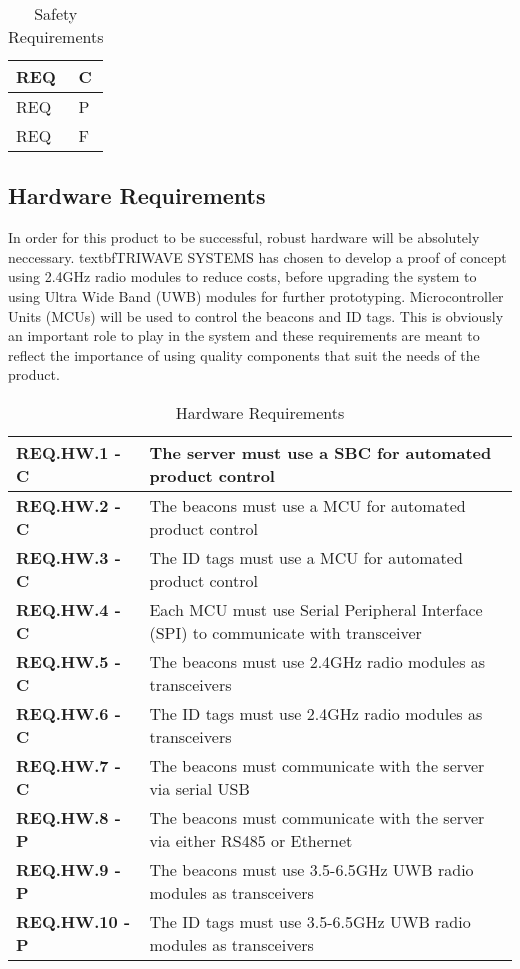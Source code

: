 \documentclass[11pt]{article}
\begin{document}
\bgroup
\def\arraystretch{1.5}
\begin{table}[H]
\centering
\begin{tabular}{ | m{3cm} | m{13cm}| } 
\hline
REQ & C\\ 
\hline
REQ & P\\ 
\hline
REQ & F\\  
\hline
\end{tabular}
\caption{Safety Requirements}
\end{table}	

\break
\subsection{Hardware Requirements}
In order for this product to be successful, robust hardware will be absolutely neccessary.  textbf{TRIWAVE SYSTEMS} has chosen to develop a proof of concept using 2.4GHz radio modules to reduce costs, before upgrading the system to using Ultra Wide Band (UWB) modules for further prototyping. Microcontroller Units (MCUs) will be used to control the beacons and ID tags. This is obviously an important role to play in the system and these requirements are meant to reflect the importance of using quality components that suit the needs of the product.
\bgroup
\def\arraystretch{1.5}
\begin{table}[H]
\centering
\begin{tabular}{ | m{3.5cm} | m{12.5cm} | } 
 \hline
 \textbf{ REQ.HW.1 - C } & The server must use a SBC for automated product control \\ 
\hline
 \textbf{ REQ.HW.2 - C } & The beacons must use a MCU for automated product control \\ 
\hline
 \textbf{ REQ.HW.3 - C } & The ID tags must use a MCU for automated product control \\ 
\hline
 \textbf{ REQ.HW.4 - C} & Each MCU must use Serial Peripheral Interface (SPI) to communicate with transceiver \\
\hline
 \textbf{ REQ.HW.5 - C } & The beacons must use 2.4GHz radio modules as transceivers \\
\hline
 \textbf{ REQ.HW.6 - C } & The ID tags must use 2.4GHz radio modules as transceivers  \\
\hline
 \textbf{ REQ.HW.7 - C } & The beacons must communicate with the server via serial  USB \\
\hline
 \textbf{ REQ.HW.8 - P } &The beacons must communicate with the server via either RS485 or Ethernet  \\
\hline
 \textbf{ REQ.HW.9 - P } & The beacons must use 3.5-6.5GHz UWB radio modules as transceivers \\
\hline
 \textbf{ REQ.HW.10 - P } & The ID tags must use 3.5-6.5GHz UWB radio modules as transceivers \\
\hline
\end{tabular}
\caption{Hardware Requirements}
\end{table}	
\end{document}
